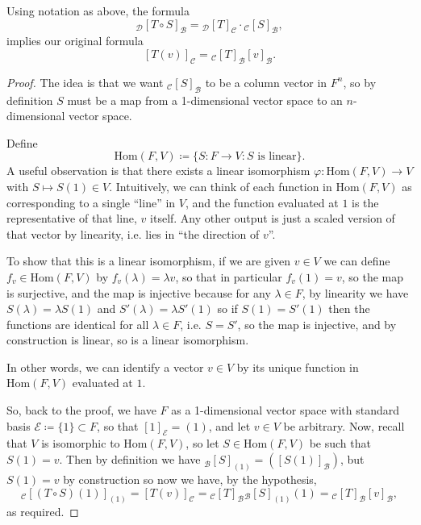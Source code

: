 \documentclass[../linear_algebra_and_groups.tex]{subfiles}
\begin{document}
\begin{proposition}
    \begin{shaded*}
         Using notation as above, the formula
         \[{}_\mathcal{D}[T\circ S]_\mathcal{B}={}_\mathcal{D}[T]_\mathcal{C}\cdot{}_\mathcal{C}[S]_\mathcal{B},\]
         implies our original formula
         \[[T(v)]_\mathcal{C}={}_\mathcal{C}[T]_\mathcal{B}[v]_\mathcal{B}.\]
    \end{shaded*}
\end{proposition}
\begin{proof}
    The idea is that we want ${}_\mathcal{C}[S]_\mathcal{B}$ to be a column vector in $F^n$, so by definition $S$ must be a map from a 1-dimensional vector space to an $n$-dimensional vector space.\par
    Define \[\mathrm{Hom}(F,V)\coloneqq\{S:F\to V:S\text{ is linear}\}.\] A useful observation is that there exists a linear isomorphism $\varphi:\mathrm{Hom}(F,V)\to V$ with $S\mapsto S(1)\in V$.
    Intuitively, we can think of each function in $\mathrm{Hom}(F,V)$ as corresponding to a single ``line'' in $V$, and the function evaluated at $1$ is the representative of that line, $v$ itself. Any other output is just a scaled version of that vector by linearity, i.e. lies in ``the direction of $v$''.\par
    To show that this is a linear isomorphism, if we are given $v\in V$ we can define $f_v\in\mathrm{Hom}(F,V)$ by $f_v(\lambda)=\lambda v$, so that in particular $f_v(1)=v$, so the map is surjective, and the map is injective because for any $\lambda\in F$, by linearity we have $S(\lambda)=\lambda S(1)$ and $S'(\lambda)=\lambda S'(1)$ so if $S(1)=S'(1)$ then the functions are identical for all $\lambda\in F$, i.e. $S=S'$, so the map is injective, and by construction is linear, so is a linear isomorphism.\par
    In other words, we can identify a vector $v\in V$ by its unique function in $\mathrm{Hom}(F,V)$ evaluated at $1$.\par
    So, back to the proof, we have $F$ as a 1-dimensional vector space with standard basis $\mathcal{E}\coloneqq\{1\}\subset F$, so that $[1]_\mathcal{E}=(1)$, and let $v\in V$ be arbitrary. Now, recall that $V$ is isomorphic to $\mathrm{Hom}(F,V)$, so let $S\in\mathrm{Hom}(F,V)$ be such that $S(1)=v$. Then by definition we have ${}_\mathcal{B}[S]_{(1)}=([S(1)]_\mathcal{B})$, but $S(1)=v$ by construction so now we have, by the hypothesis, \[{}_{\mathcal{C}}[(T\circ S)(1)]_{(1)}=[T(v)]_{\mathcal{C}}={}_\mathcal{C}[T]_\mathcal{B}{}_\mathcal{B}[S]_{(1)}(1)={}_\mathcal{C}[T]_\mathcal{B}[v]_\mathcal{B},\]
    as required.\qedhere
\end{proof}
\end{document}
